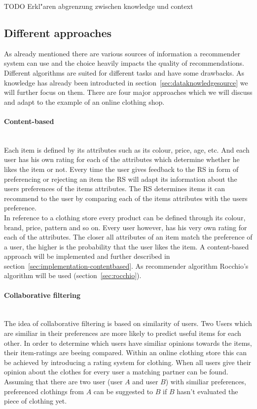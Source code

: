 {\color{red}TODO Erkl"aren abgrenzung zwischen knowledge und context}


\subsection{Different approaches}
\label{sec:recommenderapproaches}

As already mentioned there are various sources of information a recommender system can use and the choice heavily impacts the quality of recommendations.
Different algorithms are suited for different tasks and have some drawbacks.\citep[p.~377-378]{burke:2007}
As knowledge has already been introducted in section~\ref{sec:dataknowledgesource} we will further focus on them.
There are four major approaches which we will discuss and adapt to the example of an online clothing shop.

\paragraph{Content-based}~\\
Each item is defined by its attributes such as its colour, price, age, etc.
And each user has his own rating for each of the attributes which determine whether he likes the item or not.
Every time the user gives feedback to the RS in form of preferencing or rejecting an item the RS will adapt its information about the users preferences of the items attributes.
The RS determines items it can recommend to the user by comparing each of the items attributes with the users preference.
\citep[p.~75]{lops:2011}\\
In reference to a clothing store every product can be defined through its colour, brand, price, pattern and so on.
Every user however, has his very own rating for each of the attributes.
The closer all attributes of an item match the preference of a user, the higher is the probability that the user likes the item.
A content-based approach will be implemented and further described in section~\ref{sec:implementation-contentbased}.
As recommender algorithm Rocchio's algorithm will be used (section~\ref{sec:rocchio}).

\paragraph{Collaborative filtering}~\\
The idea of collaborative filtering is based on similarity of users.
Two Users which are similiar in their preferences are more likely to predict useful items for each other.
In order to determine which users have similiar opinions towards the items, their item-ratings are beeing compared.
\citep[p.~291-292]{schafer:2007}
Within an online clothing store this can be achieved by introducing a rating system for clothing.
When all users give their opinion about the clothes for every user a matching partner can be found.
Assuming that there are two user (user $A$ and user $B$) with similiar preferences, preferenced clothings from $A$ can be suggested to $B$ if $B$ hasn't evaluated the piece of clothing yet.

